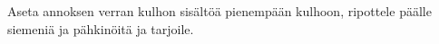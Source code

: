\begin{recipe}
{		Aseta annoksen verran kulhon sisältöä pienempään kulhoon, ripottele päälle siemeniä ja 
		pähkinöitä ja tarjoile.
    }
    
%    
%    
    
\end{recipe}
